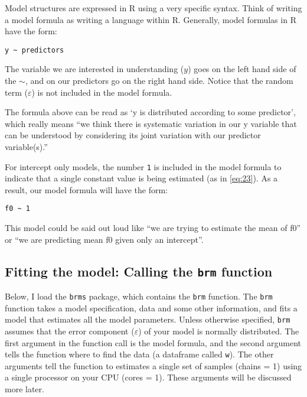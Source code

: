\documentclass[
]{book}
\begin{document}
Model structures are expressed in R using a very specific syntax. Think of writing a model formula as writing a language within R. Generally, model formulas in R have the form:

\texttt{y\ \textasciitilde{}\ predictors}

The variable we are interested in understanding (\(y\)) goes on the left hand side of the \(\sim\), and on our predictors go on the right hand side. Notice that the random term (\(\varepsilon\)) is not included in the model formula.

The formula above can be read as `y is distributed according to some predictor', which really means ``we think there is systematic variation in our y variable that can be understood by considering its joint variation with our predictor variable(s).''

For intercept only models, the number \texttt{1} is included in the model formula to indicate that a single constant value is being estimated (as in \eqref{eq:23}). As a result, our model formula will have the form:

\texttt{f0\ \textasciitilde{}\ 1}

This model could be said out loud like ``we are trying to estimate the mean of f0'' or ``we are predicting mean f0 given only an intercept''.

\hypertarget{fitting-the-model-calling-the-brm-function}{%
\subsection{\texorpdfstring{Fitting the model: Calling the \texttt{brm} function}{Fitting the model: Calling the brm function}}\label{fitting-the-model-calling-the-brm-function}}

Below, I load the \texttt{brms} package, which contains the \texttt{brm} function. The \texttt{brm} function takes a model specification, data and some other information, and fits a model that estimates all the model parameters. Unless otherwise specified, \texttt{brm} assumes that the error component (\(\varepsilon\)) of your model is normally distributed. The first argument in the function call is the model formula, and the second argument tells the function where to find the data (a dataframe called \texttt{w}). The other arguments tell the function to estimates a single set of samples (chains = 1) using a single processor on your CPU (cores = 1). These arguments will be discussed more later.
\end{document}
